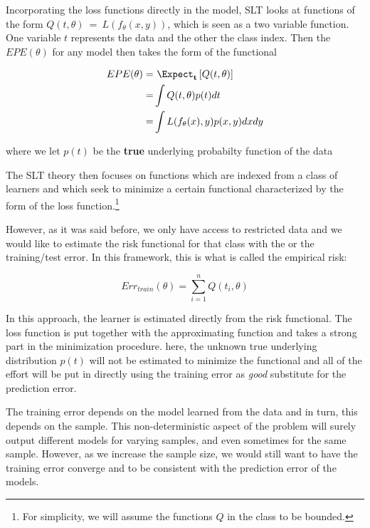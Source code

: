 Incorporating the loss functions directly in the model, SLT looks at functions of the form $Q(t,\theta) \ = \ L(f_\theta(x,y))$, which is seen as a two variable function. One variable $t$ represents the data and the other the class index. Then the $EPE(\theta)$ for any model then takes the form of the functional

\begin{equation}\label{vapnik-risk}
\begin{split}
 EPE(\theta) = & \ \Expect_{\textbf{t}} \left[  Q(t,\theta) \right]\\
= & \int Q(t,\theta) p(t) dt  \\
= & \int L(f_\theta(x),y) p(x,y) dx dy 
\end{split}
\end{equation}

where we let $p(t)$ be the \textbf{true} underlying probabilty function of the data

The SLT theory then focuses on functions which are indexed from a class of learners and which seek to minimize a certain functional characterized by the form of the loss function.\footnote{For simplicity, we will assume the functions $Q$ in the class to be bounded.} 

However, as it was said before, we only have access to restricted data and we would like to estimate the risk functional for that class with the or the training/test error. In this framework, this is what is called the empirical risk:

\begin{equation}\label{vapnik-empiricalRisk}
Err_{train}(\theta) =  \sum_{i=1}^n Q(t_i,\theta) 
\end{equation}

In this approach, the learner is estimated directly from the risk functional. The loss function is put together with the approximating function and takes a strong part in the minimization procedure. 
here, the unknown true underlying distribution $p(t)$ will not be estimated to minimize the functional and all of the effort will be put in directly using the training error as \textit{good} substitute for the prediction error.


The training error depends on the model learned from the data and in turn, this depends on the sample.
This non-deterministic aspect of the problem will surely output different models for varying samples, and even sometimes for the same sample. However, as we increase the sample size, we would still want to have the training error converge and to be consistent with the prediction error of the models.



